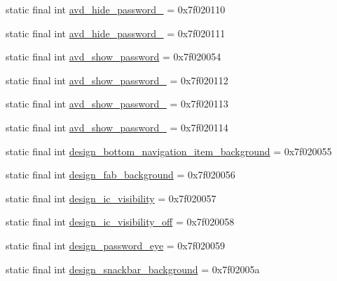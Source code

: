 \begin{CompactItemize}
\item 
static final int \hyperlink{classandroid_1_1support_1_1graphics_1_1drawable_1_1animated_1_1_r_1_1drawable_f5becf9c1cbef2c6a172338b673b96d3}{avd\_\-hide\_\-password\_} = 0x7f020110
\item 
static final int \hyperlink{classandroid_1_1support_1_1graphics_1_1drawable_1_1animated_1_1_r_1_1drawable_98ce85f85b394317bf221dc6722491af}{avd\_\-hide\_\-password\_} = 0x7f020111
\item 
static final int \hyperlink{classandroid_1_1support_1_1graphics_1_1drawable_1_1animated_1_1_r_1_1drawable_7a5f8c9a6b39fc11139b937d64d164ec}{avd\_\-show\_\-password} = 0x7f020054
\item 
static final int \hyperlink{classandroid_1_1support_1_1graphics_1_1drawable_1_1animated_1_1_r_1_1drawable_17e99a3a1b914180ed91f9b3afa38892}{avd\_\-show\_\-password\_} = 0x7f020112
\item 
static final int \hyperlink{classandroid_1_1support_1_1graphics_1_1drawable_1_1animated_1_1_r_1_1drawable_1bdb11b9f3d1fbde6eb96744f3746ae4}{avd\_\-show\_\-password\_} = 0x7f020113
\item 
static final int \hyperlink{classandroid_1_1support_1_1graphics_1_1drawable_1_1animated_1_1_r_1_1drawable_65d1bf6fc0046c0bd4cd326ab3e3f552}{avd\_\-show\_\-password\_} = 0x7f020114
\item 
static final int \hyperlink{classandroid_1_1support_1_1graphics_1_1drawable_1_1animated_1_1_r_1_1drawable_8df2416aefaed470f1b04fa1e4761304}{design\_\-bottom\_\-navigation\_\-item\_\-background} = 0x7f020055
\item 
static final int \hyperlink{classandroid_1_1support_1_1graphics_1_1drawable_1_1animated_1_1_r_1_1drawable_a75666766748e254d1f4406f89f8b9a8}{design\_\-fab\_\-background} = 0x7f020056
\item 
static final int \hyperlink{classandroid_1_1support_1_1graphics_1_1drawable_1_1animated_1_1_r_1_1drawable_6c7b1493e1a3406b51bdd529ffda538b}{design\_\-ic\_\-visibility} = 0x7f020057
\item 
static final int \hyperlink{classandroid_1_1support_1_1graphics_1_1drawable_1_1animated_1_1_r_1_1drawable_1116a05643c855bb27390c95625da094}{design\_\-ic\_\-visibility\_\-off} = 0x7f020058
\item 
static final int \hyperlink{classandroid_1_1support_1_1graphics_1_1drawable_1_1animated_1_1_r_1_1drawable_f7ef97841c3d07e6179a3fd228f9e229}{design\_\-password\_\-eye} = 0x7f020059
\item 
static final int \hyperlink{classandroid_1_1support_1_1graphics_1_1drawable_1_1animated_1_1_r_1_1drawable_d0495c4816d37f9d493d62e2257b903c}{design\_\-snackbar\_\-background} = 0x7f02005a

\end{CompactItemize}
